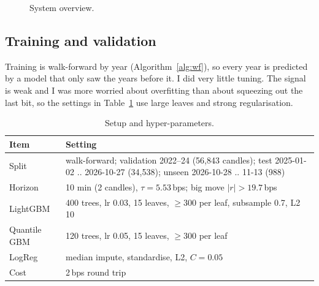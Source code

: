 \documentclass[11pt,a4paper]{article}
\begin{document}
\begin{figure}[t]
\centering
{}
\caption{System overview.}
\label{fig:arch}
\end{figure}

\subsection{Training and validation}
Training is walk-forward by year (Algorithm~\ref{alg:wf}), so every year is predicted by a model that only saw the
years before it. I did very little tuning. The signal is weak and I was more worried about overfitting than about
squeezing out the last bit, so the settings in Table~\ref{tab:setup} use large leaves and strong regularisation.

\begin{table}[t]
\centering\small
\caption{Setup and hyper-parameters.}
\label{tab:setup}
\begin{tabularx}{\columnwidth}{@{}l X@{}}
\toprule
Item & Setting \\
\midrule
Split & walk-forward; validation 2022--24 (56,843 candles); test 2025-01-02 .. 2026-10-27 (34,538); unseen 2026-10-28 .. 11-13 (988) \\
Horizon & 10 min (2 candles), $\tau=5.53$\,bps; big move $|r|>19.7$\,bps \\
LightGBM & 400 trees, lr 0.03, 15 leaves, $\geq$300 per leaf, subsample 0.7, L2 10 \\
Quantile GBM & 120 trees, lr 0.05, 15 leaves, $\geq$300 per leaf \\
LogReg & median impute, standardise, L2, $C=0.05$ \\
Cost & 2\,bps round trip \\
\bottomrule
\end{tabularx}
\end{table}
\end{document}
